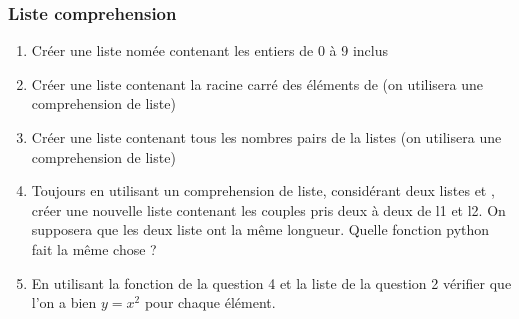 \documentclass[letterpaper,10pt,english]{sphinxhowto}
\begin{document}
\subsubsection{Liste comprehension}
\label{\detokenize{cours3_conteneur_exercices:liste-comprehension}}\begin{enumerate}
%
\item {} 
\sphinxAtStartPar
Créer une liste nomée  contenant les entiers de 0 à 9 inclus

\item {} 
\sphinxAtStartPar
Créer une liste contenant la racine carré des éléments de  (on utilisera une comprehension de liste)

\item {} 
\sphinxAtStartPar
Créer une liste contenant tous les nombres pairs de la listes  (on utilisera une comprehension de liste)

\item {} 
\sphinxAtStartPar
Toujours en utilisant un comprehension de liste, considérant deux listes  et , créer une nouvelle liste contenant les couples pris deux à deux de l1 et l2. On supposera que les deux liste ont la même longueur. Quelle fonction python fait la même chose ?

\item {} 
\sphinxAtStartPar
En utilisant la fonction de la question 4 et la liste de la question 2 vérifier que l’on a bien \(y=x^2\) pour chaque élément.

\end{enumerate}
\end{document}
